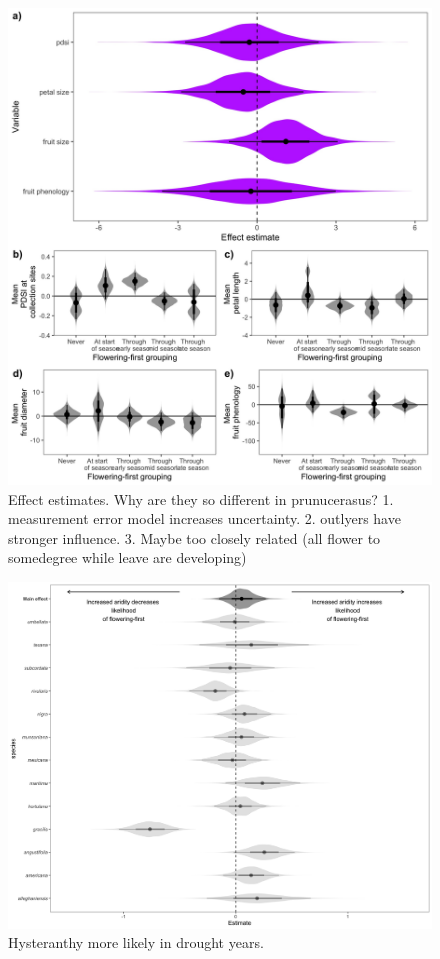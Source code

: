 \documentclass{article}\usepackage[]{graphicx}\usepackage[]{color}
\begin{document}
\begin{figure}[h!]
    \centering
 \includegraphics[width=\textwidth]{..//..//Plots/cerasus_mus.jpeg}
    \caption{Effect estimates. Why are they so different in prunucerasus? 1. measurement error model increases uncertainty. 2. outlyers have stronger influence. 3. Maybe too closely related (all flower to somedegree while leave are developing) }
    \label{fig:prunes}
\end{figure}


\begin{figure}[h!]
    \centering
 \includegraphics[width=\textwidth]{..//..//Plots/droughtstuff.jpg}
    \caption{Hysteranthy more likely in drought years.}
    \label{fig:plastic}
\end{figure}
\end{document}
